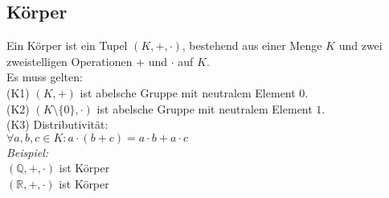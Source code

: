 \subsection*{Körper}
Ein Körper ist ein Tupel $(K,+,\cdot)$, bestehend aus einer Menge $K$ und zwei 
zweistelligen Operationen $+$ und $\cdot$ auf $K$.\\
Es muss gelten:\\
(K1) $(K,+)$ ist abelsche Gruppe mit neutralem Element $0$.\\
(K2) $(K\setminus \{0\},\cdot)$ ist abelsche Gruppe mit neutralem Element $1$.\\
(K3) Distributivität:\\
$\forall a,b,c\in K:a\cdot (b+c)=a\cdot b+a\cdot c$\\
\emph{Beispiel:}\\
$(\mathbb{Q},+,\cdot)$ ist Körper\\
$(\mathbb{R},+,\cdot)$ ist Körper

\
